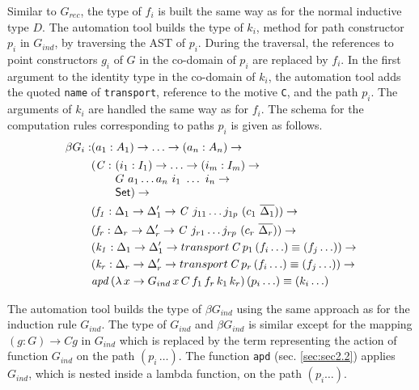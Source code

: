 \documentclass[sigplan,10pt]{acmart}
\begin{document}
Similar to $G_{rec}$, the type of $f_i$ is built the same way as for the normal inductive type $D$. The automation tool builds the type of $k_i$, method for path constructor $p_i$ in $G_{ind}$, by traversing the AST of $p_i$. During the traversal, the references to point constructors $g_i$ of $G$ in the co-domain of $p_i$ are replaced by $f_i$. In the first argument to the identity type in the co-domain of $k_i$, the automation tool adds the quoted {\tt name} of {\tt transport}, reference to the motive {\tt C}, and the path $p_i$. The arguments of $k_i$ are handled the same way as for $f_i$. The schema for the computation rules corresponding to paths $p_i$ is given as follows.
\begin{align*}
\beta G_i : & (a_1 : A_1) \to \ldots \to (a_n : A_n) \to\\
& \begin{array}{@{}l@{}l}(\mathit{C} :\ & (i_1 : I_1) \to \ldots \to (i_m : I_m) \to\\  & G\ a_1 \ldots a_n\ i_1\ \ldots\ i_n \to\\ &\SET{})\to\end{array} \\
& (\mathit{f_1} : \Delta_1 \to  \Delta_1^\prime \to \mathit{C}\ j_{11} \ldots j_{1p}\ (c_1\ \overline{\Delta_1})) \to \\
& (\mathit{f_r} : \Delta_r \to  \Delta_r^\prime \to \mathit{C}\ j_{r1} \ldots j_{rp}\ (c_r\ \overline{\Delta_r})) \to \\
& (\mathit{k_1} : \Delta_1 \to  \Delta_1^\prime \to transport \, \mathit{C} \, p_1 \, (f_i \ldots) \equiv (f_j \ldots)) \to \\
& (\mathit{k_r} : \Delta_r \to  \Delta_r^\prime \to transport \, \mathit{C} \, p_r \, (f_i \ldots) \equiv (f_j \ldots)) \to \\
& \mathit{apd} \, (\lambda \, x \to G_{ind} \, x \, C \, f_1 \, f_r \, k_1 \, k_r) \, (p_i \ldots) \equiv (k_i \ldots)
\end{align*}

The automation tool builds the type of $\beta G_{ind}$ using the same approach as for the induction rule $G_{ind}$. The type of $G_{ind}$ and $\beta G_{ind}$ is similar except for the mapping $(g : G) \to C g$ in $G_{ind}$ which is replaced by the term representing the action of function $G_{ind}$ on the path $(p_i \, \ldots)$. The function {\tt apd} (sec. \ref{sec:sec2.2}) applies $G_{ind}$, which is nested inside a lambda function, on the path $(p_i \ldots)$.
\end{document}
